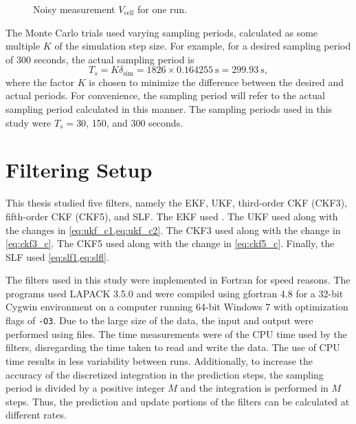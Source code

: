 \documentclass[../zhang_thesis.tex]{subfiles}
\begin{document}
\begin{figure}[htb]
\centering
%
\caption{Noisy measurement $V_\text{cell}$ for one run.}
\label{fig:meas}
\end{figure}

The Monte Carlo trials used varying sampling periods, calculated as some multiple $K$ of the simulation step size. For example, for a desired sampling period of 300 seconds, the actual sampling period is
\begin{equation}
    T_s = K \delta_\text{sim} = 1826 \times 0.164255~\text{s} = 299.93~\text{s},
\end{equation}
where the factor $K$ is chosen to minimize the difference between the desired and actual periods. For convenience, the sampling period will refer to the actual sampling period calculated in this manner. The sampling periods used in this study were $T_s=30$, 150, and 300 seconds.

\section{Filtering Setup}

This thesis studied five filters, namely the EKF, UKF, third-order CKF (CKF3), fifth-order CKF (CKF5), and SLF. The EKF used . The UKF used  along with the changes in \cref{eq:ukf_c1,eq:ukf_c2}. The CKF3 used  along with the change in \cref{eq:ckf3_c}. The CKF5 used  along with the change in \cref{eq:ckf5_c}. Finally, the SLF used \cref{eq:slf1,eq:slfl}.

The filters used in this study were implemented in Fortran for speed reasons. The programs used LAPACK 3.5.0 and were compiled using gfortran 4.8 for a 32-bit Cygwin environment on a computer running 64-bit Windows 7 with optimization flags of \texttt{-O3}. Due to the large size of the data, the input and output were performed using files. The time measurements were of the CPU time used by the filters, disregarding the time taken to read and write the data. The use of CPU time results in less
variability between runs. Additionally, to increase the accuracy of the discretized integration in the prediction steps, the sampling period is divided by a positive integer $M$ and the integration is performed in $M$ steps. Thus, the prediction and update portions of the filters can be calculated at different rates.
\end{document}
